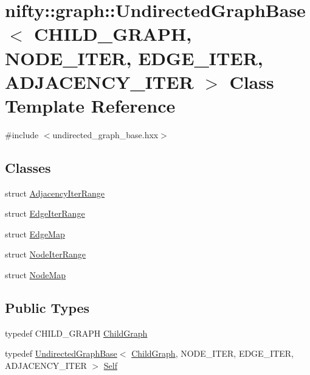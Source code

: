 \hypertarget{classnifty_1_1graph_1_1UndirectedGraphBase}{}\section{nifty\+:\+:graph\+:\+:Undirected\+Graph\+Base$<$ C\+H\+I\+L\+D\+\_\+\+G\+R\+A\+PH, N\+O\+D\+E\+\_\+\+I\+T\+ER, E\+D\+G\+E\+\_\+\+I\+T\+ER, A\+D\+J\+A\+C\+E\+N\+C\+Y\+\_\+\+I\+T\+ER $>$ Class Template Reference}
\label{classnifty_1_1graph_1_1UndirectedGraphBase}


{\ttfamily \#include $<$undirected\+\_\+graph\+\_\+base.\+hxx$>$}

\subsection*{Classes}
\begin{DoxyCompactItemize}
\item 
struct \hyperlink{structnifty_1_1graph_1_1UndirectedGraphBase_1_1AdjacencyIterRange}{Adjacency\+Iter\+Range}
\item 
struct \hyperlink{structnifty_1_1graph_1_1UndirectedGraphBase_1_1EdgeIterRange}{Edge\+Iter\+Range}
\item 
struct \hyperlink{structnifty_1_1graph_1_1UndirectedGraphBase_1_1EdgeMap}{Edge\+Map}
\item 
struct \hyperlink{structnifty_1_1graph_1_1UndirectedGraphBase_1_1NodeIterRange}{Node\+Iter\+Range}
\item 
struct \hyperlink{structnifty_1_1graph_1_1UndirectedGraphBase_1_1NodeMap}{Node\+Map}
\end{DoxyCompactItemize}
\subsection*{Public Types}
\begin{DoxyCompactItemize}
\item 
typedef C\+H\+I\+L\+D\+\_\+\+G\+R\+A\+PH \hyperlink{classnifty_1_1graph_1_1UndirectedGraphBase_af2541cf9fb91440ff0a7b56dd5a6be29}{Child\+Graph}
\item 
typedef \hyperlink{classnifty_1_1graph_1_1UndirectedGraphBase}{Undirected\+Graph\+Base}$<$ \hyperlink{classnifty_1_1graph_1_1UndirectedGraphBase_af2541cf9fb91440ff0a7b56dd5a6be29}{Child\+Graph}, N\+O\+D\+E\+\_\+\+I\+T\+ER, E\+D\+G\+E\+\_\+\+I\+T\+ER, A\+D\+J\+A\+C\+E\+N\+C\+Y\+\_\+\+I\+T\+ER $>$ \hyperlink{classnifty_1_1graph_1_1UndirectedGraphBase_a3a637f240a8d05794be99e5f290a71b9}{Self}
\end{DoxyCompactItemize}
